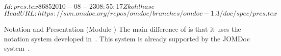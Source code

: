 \svnInfo $Id: pres.tex 8685 2010-08-23 08:55:17Z kohlhase $
\svnKeyword $HeadURL: https://svn.omdoc.org/repos/omdoc/branches/omdoc-1.3/doc/spec/pres.tex $

\begin{tchapter}[id=pres,short=Notation and Presentation]{Notation and Presentation (Module {})}
  The main difference of {} is that it uses the notation system developed
  in~\cite{cmueller:thesis:10,KMR:NoLMD08}. This system is already supported by the JOMDoc
  system~\cite{JOMDoc:on}.
\end{tchapter}

